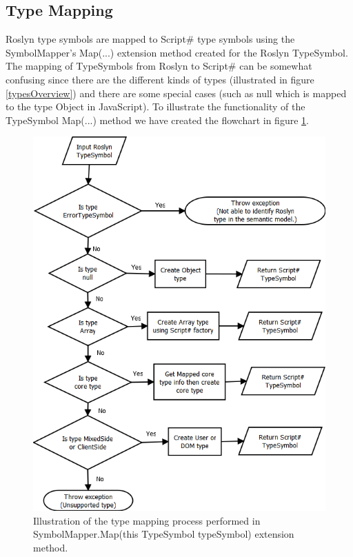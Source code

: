 	\subsection{Type Mapping} %
	\label{sub:type_mapping}
		Roslyn type symbols are mapped to Script\# type symbols using the SymbolMapper’s Map(...) extension method created for the Roslyn TypeSymbol. The mapping of TypeSymbols from Roslyn to Script\# can be somewhat confusing since there are the different kinds of types (illustrated in figure \ref{typesOverview}) and there are some special cases (such as null which is mapped to the type Object in JavaScript). To illustrate the functionality of the TypeSymbol Map(...) method we have created the flowchart in figure \ref{typeMappingFlowchart}.

			\begin{figure}
			\begin{center}
					\includegraphics[width=14cm]{resources/images/TypeMappingFlowchart.png}
					\end{center}
				\caption{Illustration of the type mapping process performed in SymbolMapper.Map(this TypeSymbol typeSymbol) extension method.}
				\label{typeMappingFlowchart}
			\end{figure}


